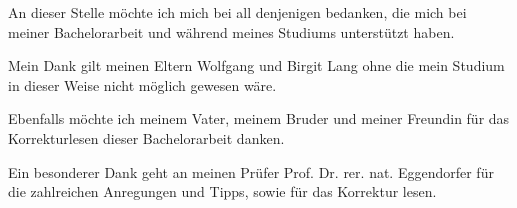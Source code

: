 \label{cha:danksagung}
An dieser Stelle möchte ich mich bei all denjenigen bedanken, die mich bei meiner Bachelorarbeit und während meines Studiums unterstützt haben.

Mein Dank gilt meinen Eltern Wolfgang und Birgit Lang ohne die mein Studium in dieser Weise nicht möglich gewesen wäre.

Ebenfalls möchte ich meinem Vater, meinem Bruder und meiner Freundin für das Korrekturlesen dieser Bachelorarbeit danken.

Ein besonderer Dank geht an meinen Prüfer Prof. Dr. rer. nat. Eggendorfer für die zahlreichen Anregungen und Tipps, sowie für das Korrektur lesen.




